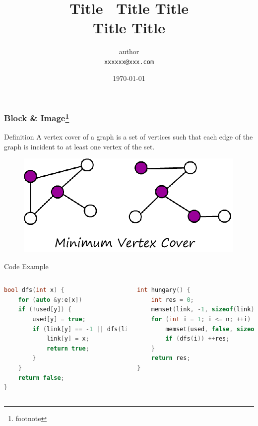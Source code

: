 


\graphicspath{{assets/}}

\title{Title \ Title Title \\ Title Title}
\author{author\\ \texttt{xxxxxx@xxx.com}}
\date{ \today}

\frame[plain]\titlepage

\begin{frame}[containsverbatim]
\frametitle{Block \& Image\footnote{footnote}}
	\begin{block}{Definition}
		A vertex cover of a graph is a set of vertices such that each edge of the graph is incident to at least one vertex of the set.
	\end{block}

	\begin{figure}[h!]
		\centering
		\includegraphics[scale=0.6]{example.png}	%
	\end{figure}
\end{frame}


\begin{frame}[containsverbatim]{Code Example}
	\begin{columns}[c]
		\begin{lstlisting}[language=C++,aboveskip=0pt,basicstyle=\linespread{1.1}\small\ttfamily]
bool dfs(int x) {
	for (auto &y:e[x])
	if (!used[y]) {
		used[y] = true;
		if (link[y] == -1 || dfs(link[y])) {
			link[y] = x;
			return true;
		}
	}
	return false;
}
\end{lstlisting}
		\begin{lstlisting}[language=C++,aboveskip=0pt,basicstyle=\linespread{1.1}\small\ttfamily]
int hungary() {
	int res = 0;
	memset(link, -1, sizeof(link));
	for (int i = 1; i <= n; ++i) {
		memset(used, false, sizeof(used));
		if (dfs(i)) ++res;
	}
	return res;
}
\end{lstlisting}
	\end{columns}
\end{frame}


